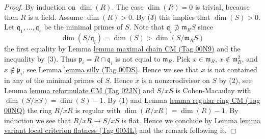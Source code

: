 \documentclass{amsart}
\theoremstyle{plain}
\theoremstyle{definition}
\theoremstyle{remark}
\numberwithin{equation}{subsection}
\begin{document}
\begin{proof}
By induction on $\dim(R)$. The case $\dim(R) = 0$ is trivial, because
then $R$ is a field. Assume $\dim(R) > 0$. By (3) this implies that
$\dim(S) > 0$. Let $\mathfrak q_1, \ldots, \mathfrak q_r$ be the minimal
primes of $S$. Note that $\mathfrak q_i \not \supset \mathfrak m_R S$ since
$$
\dim(S/\mathfrak q_i) = \dim(S) > \dim(S/\mathfrak m_R S)
$$
the first equality by Lemma \href{https://stacks.math.columbia.edu/tag/00N9}{lemma maximal chain CM (Tag 00N9)} and the
inequality by (3). Thus
$\mathfrak p_i = R \cap \mathfrak q_i$ is not equal to $\mathfrak m_R$.
Pick $x \in \mathfrak m_R$, $x \not \in \mathfrak m_R^2$, and
$x \not \in \mathfrak p_i$, see
Lemma \href{https://stacks.math.columbia.edu/tag/00DS}{lemma silly (Tag 00DS)}.
Hence we see that $x$ is not contained in any of the minimal
primes of $S$. Hence $x$ is a nonzerodivisor on $S$ by (2), see
Lemma \href{https://stacks.math.columbia.edu/tag/02JN}{lemma reformulate CM (Tag 02JN)} and
$S/xS$ is Cohen-Macaulay with $\dim(S/xS) = \dim(S) - 1$.
By (1) and Lemma \href{https://stacks.math.columbia.edu/tag/00NQ}{lemma regular ring CM (Tag 00NQ)} the ring $R/xR$ is regular
with $\dim(R/xR) = \dim(R) - 1$.
By induction we see that $R/xR \to S/xS$ is flat. Hence we
conclude by Lemma \href{https://stacks.math.columbia.edu/tag/00ML}{lemma variant local criterion flatness (Tag 00ML)}
and the remark following it.
\end{proof}
\end{document}
